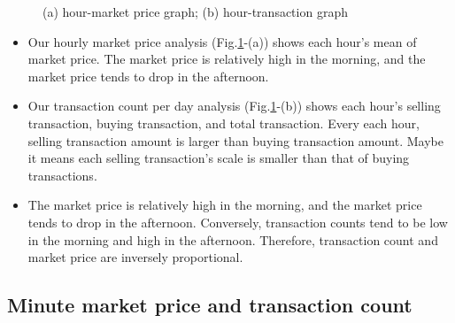 \documentclass[conference]{IEEEtran}
\begin{document}
\begin{figure}[htbp]
\centering
{}
\caption{(a) hour-market price graph; (b) hour-transaction graph}
\label{fig:hour}
\vspace{-0.5cm}
\end{figure}

\begin{itemize}
\item Our hourly market price analysis (Fig.\ref{fig:hour}-(a)) shows each hour's mean of market price. The market price is relatively high in the morning, and the market price tends to drop in the afternoon. 
\item Our transaction count per day analysis (Fig.\ref{fig:hour}-(b)) shows each hour's selling transaction, buying transaction, and total transaction. Every each hour, selling transaction amount is larger than buying transaction amount. Maybe it means each selling transaction's scale is smaller than that of buying transactions.
\item The market price is relatively high in the morning, and the market price tends to drop in the afternoon. Conversely, transaction counts tend to be low in the morning and high in the afternoon. Therefore, transaction count and market price are inversely proportional.
\end{itemize}

\subsection{Minute market price and transaction count}
\end{document}
